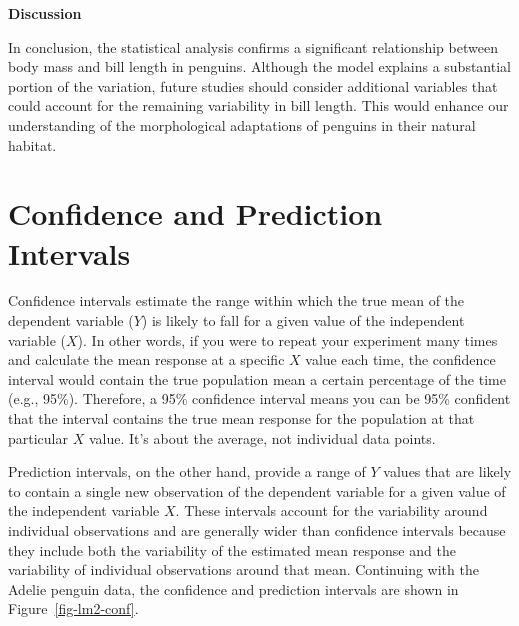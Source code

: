 \documentclass[
  letterpaper,
]{book}
\begin{document}
\textbf{Discussion}

In conclusion, the statistical analysis confirms a significant
relationship between body mass and bill length in penguins. Although the
model explains a substantial portion of the variation, future studies
should consider additional variables that could account for the
remaining variability in bill length. This would enhance our
understanding of the morphological adaptations of penguins in their
natural habitat.

\section{Confidence and Prediction
Intervals}\label{confidence-and-prediction-intervals}

Confidence intervals estimate the range within which the true mean of
the dependent variable (\(Y\)) is likely to fall for a given value of
the independent variable (\(X\)). In other words, if you were to repeat
your experiment many times and calculate the mean response at a specific
\(X\) value each time, the confidence interval would contain the true
population mean a certain percentage of the time (e.g., 95\%).
Therefore, a 95\% confidence interval means you can be 95\% confident
that the interval contains the true mean response for the population at
that particular \(X\) value. It's about the average, not individual data
points.

Prediction intervals, on the other hand, provide a range of \(Y\) values
that are likely to contain a single new observation of the dependent
variable for a given value of the independent variable \(X\). These
intervals account for the variability around individual observations and
are generally wider than confidence intervals because they include both
the variability of the estimated mean response and the variability of
individual observations around that mean. Continuing with the Adelie
penguin data, the confidence and prediction intervals are shown in
Figure~\ref{fig-lm2-conf}.
\end{document}
